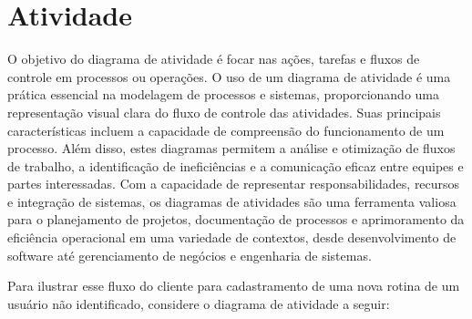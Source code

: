\chapter{Atividade}

O objetivo do diagrama de atividade é focar nas ações, tarefas e fluxos de controle
em processos ou operações. O uso de um diagrama de atividade é uma prática essencial
na modelagem de processos e sistemas, proporcionando uma representação visual clara
do fluxo de controle das atividades. Suas principais características incluem a capacidade
de compreensão do funcionamento de um processo. Além disso, estes diagramas permitem
a análise e otimização de fluxos de trabalho, a identificação de ineficiências e a
comunicação eficaz entre equipes e partes interessadas. Com a capacidade de representar
responsabilidades, recursos e integração de sistemas, os diagramas de atividades
são uma ferramenta valiosa para o planejamento de projetos, documentação de processos
e aprimoramento da eficiência operacional em uma variedade de contextos, desde desenvolvimento
de software até gerenciamento de negócios e engenharia de sistemas.

Para ilustrar esse fluxo do cliente para cadastramento de uma nova rotina de um usuário
não identificado, considere o diagrama de atividade a seguir:

